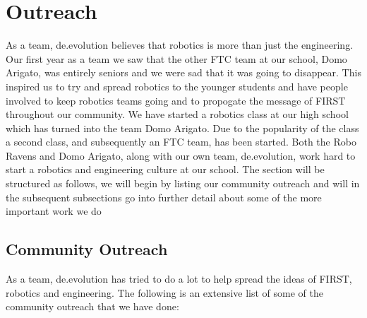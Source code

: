 \section{Outreach}
As a team, de.evolution believes that robotics is more than just the engineering. Our first year as a team we saw that the other FTC team at our school, Domo Arigato, was entirely seniors and we were sad that it was going to disappear. This inspired us to try and spread robotics to the younger students and have people involved to keep robotics teams going and to propogate the message of FIRST throughout our community. We have started a robotics class at our high school which has turned into the team Domo Arigato. Due to the popularity of the class a second class, and subsequently an FTC team, has been started. Both the Robo Ravens and Domo Arigato, along with our own team, de.evolution, work hard to start a robotics and engineering culture at our school. The section will be structured as follows, we will begin by listing our community outreach and will in the subsequent subsections go into further detail about some of the more important work we do

\subsection{Community Outreach}
As a team, de.evolution has tried to do a lot to help spread the ideas of FIRST, robotics and engineering. The following is an extensive list of some of the community outreach that we have done:

